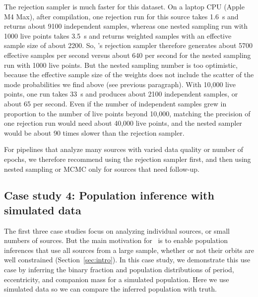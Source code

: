\documentclass[twocolumn]{AASTeX7/aastex701}
\newcommand{\harv}{\package{harv}}
\begin{document}
The rejection sampler is much faster for this dataset.
On a laptop CPU (Apple M4 Max), after  compilation, one rejection run for
this source takes 1.6~\unit{s} and returns about 9100 independent samples, whereas one
nested sampling run with 1000 live points takes 3.5~\unit{s} and returns weighted
samples with an effective sample size of about 2200.
So, \harv's rejection sampler therefore generates about 5700 effective samples per
second versus about 640 per second for the nested sampling run with 1000 live points.
But the nested sampling number is too optimistic, because the effective sample size of
the weights does not include the scatter of the mode probabilities we find above (see
previous paragraph).
With 10,000 live points, one run takes 33~\unit{s} and produces about 2100 independent
samples, or about 65 per second.
Even if the number of independent samples grew in proportion to the number of live
points beyond 10,000, matching the precision of one rejection run would need about
40,000 live points, and the nested sampler would be about 90 times slower than the
rejection sampler.

For pipelines that analyze many sources with varied data quality or number of epochs, we
therefore recommend using the rejection sampler first, and then using nested sampling or
MCMC only for sources that need follow-up.

\subsection{Case study 4: Population inference with simulated data}
\label{sec:cases-pop-inf}

The first three case studies focus on analyzing individual sources, or small numbers of
sources.
But the main motivation for \harv\ is to enable population inferences that use all
sources from a large sample, whether or not their orbits are well constrained
(Section~\ref{sec:intro}).
In this case study, we demonstrate this use case by inferring the binary fraction and
population distributions of period, eccentricity, and companion mass for a simulated
population.
Here we use simulated data so we can compare the inferred population with truth.
\end{document}
